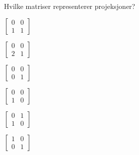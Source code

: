 \begin{oppgave}
Hvilke matriser representerer projeksjoner?
\\
\noindent
\begin{minipage}{0.14\textwidth}
\begin{punkt}
$
\begin{bmatrix}
 0 & 0\\
 1 & 1
\end{bmatrix}
$
\end{punkt}
\end{minipage}
\begin{minipage}{0.14\textwidth}
\begin{punkt}
$
\begin{bmatrix}
 0 & 0\\
 2 & 1
\end{bmatrix}
$
\end{punkt}
\end{minipage}
\begin{minipage}{0.14\textwidth}
\begin{punkt}
$
\begin{bmatrix}
 0 & 0\\
 0 & 1
\end{bmatrix}
$
\end{punkt}
\end{minipage}
\begin{minipage}{0.14\textwidth}
\begin{punkt}
$
\begin{bmatrix}
 0 & 0\\
 1 & 0
\end{bmatrix}
$
\end{punkt}
\end{minipage}
\begin{minipage}{0.14\textwidth}
\begin{punkt}
$
\begin{bmatrix}
 0 & 1\\
 1 & 0
\end{bmatrix}
$
\end{punkt}
\end{minipage}
\begin{minipage}{0.14\textwidth}
\begin{punkt}
$
\begin{bmatrix}
 1 & 0\\
 0 & 1
\end{bmatrix}
$
\end{punkt}
\end{minipage}
\end{oppgave}


